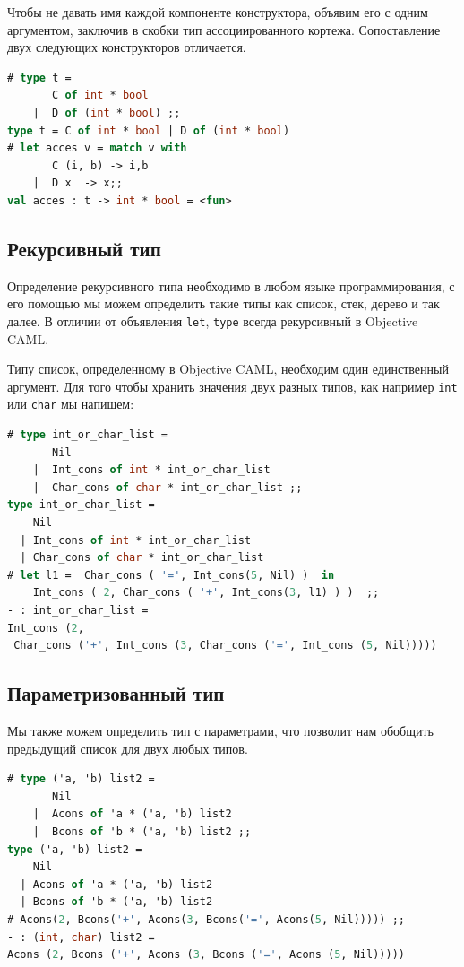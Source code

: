 Чтобы не давать имя каждой компоненте конструктора, объявим его с одним
аргументом, заключив в скобки тип ассоциированного кортежа. Сопоставление двух
следующих конструкторов отличается.

\begin{lstlisting}[language=OCaml]
# type t =
       C of int * bool
    |  D of (int * bool) ;;
type t = C of int * bool | D of (int * bool)
# let acces v = match v with
       C (i, b) -> i,b
    |  D x  -> x;;
val acces : t -> int * bool = <fun>
\end{lstlisting}

\subsection{Рекурсивный тип}

 Определение рекурсивного типа необходимо в любом языке программирования, с его
помощью мы можем определить такие типы как список, стек, дерево и так далее. В
отличии от объявления \texttt{let}, \texttt{type} всегда рекурсивный в Objective
CAML.

Типу список, определенному в Objective CAML, необходим один единственный
аргумент. Для того чтобы хранить значения двух разных типов, как например
\texttt{int} или \texttt{char} мы напишем:

\begin{lstlisting}[language=OCaml]
# type int_or_char_list =
       Nil
    |  Int_cons of int * int_or_char_list
    |  Char_cons of char * int_or_char_list ;;
type int_or_char_list =
    Nil
  | Int_cons of int * int_or_char_list
  | Char_cons of char * int_or_char_list
# let l1 =  Char_cons ( '=', Int_cons(5, Nil) )  in
    Int_cons ( 2, Char_cons ( '+', Int_cons(3, l1) ) )  ;;
- : int_or_char_list =
Int_cons (2,
 Char_cons ('+', Int_cons (3, Char_cons ('=', Int_cons (5, Nil)))))
\end{lstlisting}

\subsection{Параметризованный тип}
\label{sec:parametrized_types}

Мы также можем определить тип с параметрами, что позволит нам обобщить
предыдущий список для двух любых типов.

\begin{lstlisting}[language=OCaml]
# type ('a, 'b) list2 =
       Nil
    |  Acons of 'a * ('a, 'b) list2
    |  Bcons of 'b * ('a, 'b) list2 ;;
type ('a, 'b) list2 =
    Nil
  | Acons of 'a * ('a, 'b) list2
  | Bcons of 'b * ('a, 'b) list2
# Acons(2, Bcons('+', Acons(3, Bcons('=', Acons(5, Nil))))) ;;
- : (int, char) list2 =
Acons (2, Bcons ('+', Acons (3, Bcons ('=', Acons (5, Nil)))))
\end{lstlisting}


